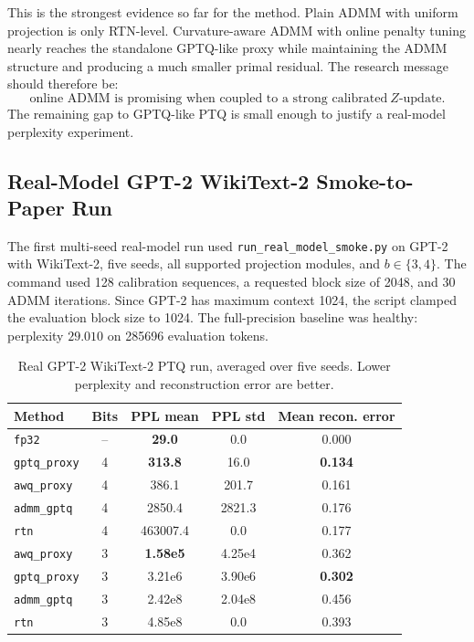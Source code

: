 \documentclass[11pt]{article}
\begin{document}
This is the strongest evidence so far for the method.  Plain ADMM with uniform
projection is only RTN-level.  Curvature-aware ADMM with online penalty tuning
nearly reaches the standalone GPTQ-like proxy while maintaining the ADMM
structure and producing a much smaller primal residual.  The research message
should therefore be:
\[
    \text{online ADMM is promising when coupled to a strong calibrated}
    \ Z\text{-update.}
\]
The remaining gap to GPTQ-like PTQ is small enough to justify a real-model
perplexity experiment.

\subsection{Real-Model GPT-2 WikiText-2 Smoke-to-Paper Run}

The first multi-seed real-model run used \texttt{run\_real\_model\_smoke.py}
on GPT-2 with WikiText-2, five seeds, all supported projection modules, and
\(b\in\{3,4\}\).  The command used 128 calibration sequences, a requested
block size of 2048, and 30 ADMM iterations.  Since GPT-2 has maximum context
1024, the script clamped the evaluation block size to 1024.  The full-precision
baseline was healthy: perplexity \(29.010\) on 285696 evaluation tokens.

\begin{table}[h]
\centering
\caption{Real GPT-2 WikiText-2 PTQ run, averaged over five seeds.  Lower
perplexity and reconstruction error are better.}
\label{tab:gpt2-real-ptq}
\begin{tabular}{lcccc}
\toprule
Method & Bits & PPL mean & PPL std & Mean recon. error\\
\midrule
\texttt{fp32} & -- & \textbf{29.0} & 0.0 & 0.000\\
\texttt{gptq\_proxy} & 4 & \textbf{313.8} & 16.0 & \textbf{0.134}\\
\texttt{awq\_proxy} & 4 & 386.1 & 201.7 & 0.161\\
\texttt{admm\_gptq} & 4 & 2850.4 & 2821.3 & 0.176\\
\texttt{rtn} & 4 & 463007.4 & 0.0 & 0.177\\
\midrule
\texttt{awq\_proxy} & 3 & \textbf{1.58e5} & 4.25e4 & 0.362\\
\texttt{gptq\_proxy} & 3 & 3.21e6 & 3.90e6 & \textbf{0.302}\\
\texttt{admm\_gptq} & 3 & 2.42e8 & 2.04e8 & 0.456\\
\texttt{rtn} & 3 & 4.85e8 & 0.0 & 0.393\\
\bottomrule
\end{tabular}
\end{table}
\end{document}
